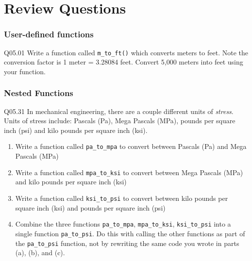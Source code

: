 \documentclass{book}
\newenvironment{problems}{}{}  %
\begin{document}
    
        \section{Review Questions}\label{review-questions}
    




    
        \begin{problems}
        \subsubsection{User-defined functions}\label{user-defined-functions}

Q05.01 Write a function called \lstinline!m_to_ft()! which converts
meters to feet. Note the conversion factor is 1 meter = 3.28084 feet.
Convert 5,000 meters into feet using your function.
        \end{problems}

    




    
        \begin{problems}
        \subsubsection{Nested Functions}\label{nested-functions}

Q05.31 In mechanical engineering, there are a couple different units of
\emph{stress}. Units of stress include: Pascals (Pa), Mega Pascals
(MPa), pounds per square inch (psi) and kilo pounds per square inch
(ksi).

\begin{enumerate}
\def\labelenumi{(\alph{enumi})}
\item
  Write a function called \lstinline!pa_to_mpa! to convert between
  Pascals (Pa) and Mega Pascals (MPa)
\item
  Write a function called \lstinline!mpa_to_ksi! to convert between Mega
  Pascals (MPa) and kilo pounds per square inch (ksi)
\item
  Write a function called \lstinline!ksi_to_psi! to convert between kilo
  pounds per square inch (ksi) and pounds per square inch (psi)
\item
  Combine the three functions \lstinline!pa_to_mpa!,
  \lstinline!mpa_to_ksi!, \lstinline!ksi_to_psi! into a single function
  \lstinline!pa_to_psi!. Do this with calling the other functions as
  part of the \lstinline!pa_to_psi! function, not by rewriting the same
  code you wrote in parts (a), (b), and (c).
\end{enumerate}
        \end{problems}
\end{document}
